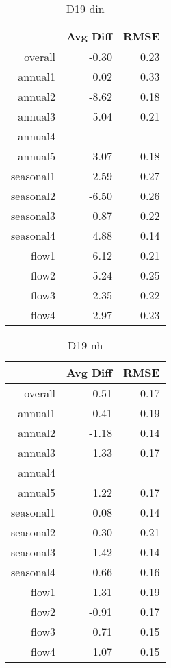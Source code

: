 \begin{table}[H]
\centering
\begin{tabular}{rrr}
  \hline
 & Avg Diff & RMSE \\ 
  \hline
overall & -0.30 & 0.23 \\ 
  annual1 & 0.02 & 0.33 \\ 
  annual2 & -8.62 & 0.18 \\ 
  annual3 & 5.04 & 0.21 \\ 
  annual4 &  &  \\ 
  annual5 & 3.07 & 0.18 \\ 
  seasonal1 & 2.59 & 0.27 \\ 
  seasonal2 & -6.50 & 0.26 \\ 
  seasonal3 & 0.87 & 0.22 \\ 
  seasonal4 & 4.88 & 0.14 \\ 
  flow1 & 6.12 & 0.21 \\ 
  flow2 & -5.24 & 0.25 \\ 
  flow3 & -2.35 & 0.22 \\ 
  flow4 & 2.97 & 0.23 \\ 
   \hline
\end{tabular}
\caption{D19 din} 
\end{table}
\begin{table}[H]
\centering
\begin{tabular}{rrr}
  \hline
 & Avg Diff & RMSE \\ 
  \hline
overall & 0.51 & 0.17 \\ 
  annual1 & 0.41 & 0.19 \\ 
  annual2 & -1.18 & 0.14 \\ 
  annual3 & 1.33 & 0.17 \\ 
  annual4 &  &  \\ 
  annual5 & 1.22 & 0.17 \\ 
  seasonal1 & 0.08 & 0.14 \\ 
  seasonal2 & -0.30 & 0.21 \\ 
  seasonal3 & 1.42 & 0.14 \\ 
  seasonal4 & 0.66 & 0.16 \\ 
  flow1 & 1.31 & 0.19 \\ 
  flow2 & -0.91 & 0.17 \\ 
  flow3 & 0.71 & 0.15 \\ 
  flow4 & 1.07 & 0.15 \\ 
   \hline
\end{tabular}
\caption{D19 nh} 
\end{table}
